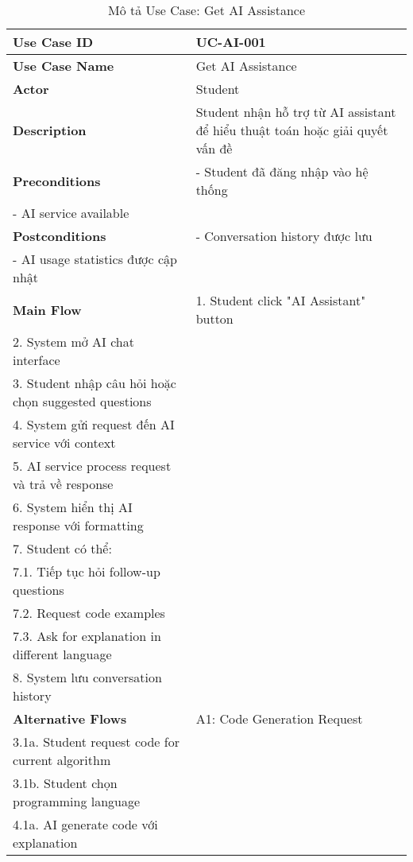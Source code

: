 \begin{table}[H]
\centering
\caption{Mô tả Use Case: Get AI Assistance}
\label{tab:uc-ai-assistance}
\begin{tabularx}{\textwidth}{|l|X|}
\hline
\textbf{Use Case ID} & UC-AI-001 \\ \hline
\textbf{Use Case Name} & Get AI Assistance \\ \hline
\textbf{Actor} & Student \\ \hline
\textbf{Description} & Student nhận hỗ trợ từ AI assistant để hiểu thuật toán hoặc giải quyết vấn đề \\ \hline
\textbf{Preconditions} & 
- Student đã đăng nhập vào hệ thống \\
- AI service available \\ \hline
\textbf{Postconditions} & 
- Conversation history được lưu \\
- AI usage statistics được cập nhật \\ \hline
\textbf{Main Flow} & 
1. Student click "AI Assistant" button \\
2. System mở AI chat interface \\
3. Student nhập câu hỏi hoặc chọn suggested questions \\
4. System gửi request đến AI service với context \\
5. AI service process request và trả về response \\
6. System hiển thị AI response với formatting \\
7. Student có thể: \\
\hspace{0.5cm} 7.1. Tiếp tục hỏi follow-up questions \\
\hspace{0.5cm} 7.2. Request code examples \\
\hspace{0.5cm} 7.3. Ask for explanation in different language \\
8. System lưu conversation history \\ \hline
\textbf{Alternative Flows} & 
A1: Code Generation Request \\
\hspace{0.5cm} 3.1a. Student request code for current algorithm \\
\hspace{0.5cm} 3.1b. Student chọn programming language \\
\hspace{0.5cm} 4.1a. AI generate code với explanation \\

\end{tabularx}
\end{table}
